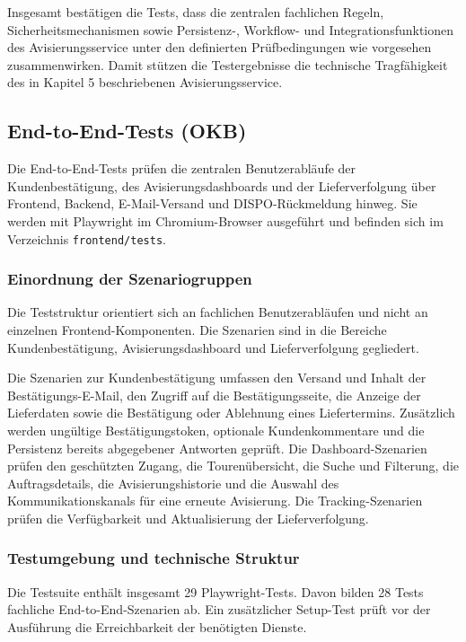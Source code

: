Insgesamt bestätigen die Tests, dass die zentralen fachlichen Regeln,
Sicherheitsmechanismen sowie Persistenz-, Workflow- und Integrationsfunktionen
des Avisierungsservice unter den definierten Prüfbedingungen wie vorgesehen
zusammenwirken. Damit stützen die Testergebnisse die technische Tragfähigkeit
des in Kapitel 5 beschriebenen Avisierungsservice.

\subsection{End-to-End-Tests (OKB)}
\label{sec:validierung-frontend}

Die End-to-End-Tests prüfen die zentralen Benutzerabläufe der
Kundenbestätigung, des Avisierungsdashboards und der
Lieferverfolgung über Frontend, Backend, E-Mail-Versand und
DISPO-Rückmeldung hinweg. Sie werden mit Playwright im
Chromium-Browser ausgeführt und befinden sich im Verzeichnis
\texttt{frontend/tests}.

\subsubsection{Einordnung der Szenariogruppen}

Die Teststruktur orientiert sich an fachlichen Benutzerabläufen
und nicht an einzelnen Frontend-Komponenten. Die Szenarien sind
in die Bereiche Kundenbestätigung, Avisierungsdashboard und
Lieferverfolgung gegliedert.

Die Szenarien zur Kundenbestätigung umfassen den Versand und
Inhalt der Bestätigungs-E-Mail, den Zugriff auf die Bestätigungsseite,
die Anzeige der Lieferdaten sowie die Bestätigung oder Ablehnung
eines Liefertermins. Zusätzlich werden ungültige
Bestätigungstoken, optionale Kundenkommentare und die Persistenz
bereits abgegebener Antworten geprüft. Die
Dashboard-Szenarien prüfen den geschützten Zugang, die
Tourenübersicht, die Suche und Filterung, die Auftragsdetails,
die Avisierungshistorie und die Auswahl des Kommunikationskanals
für eine erneute Avisierung. Die Tracking-Szenarien prüfen die
Verfügbarkeit und Aktualisierung der Lieferverfolgung.

\subsubsection{Testumgebung und technische Struktur}

Die Testsuite enthält insgesamt 29 Playwright-Tests. Davon
bilden 28 Tests fachliche End-to-End-Szenarien ab. Ein
zusätzlicher Setup-Test prüft vor der Ausführung die
Erreichbarkeit der benötigten Dienste.

